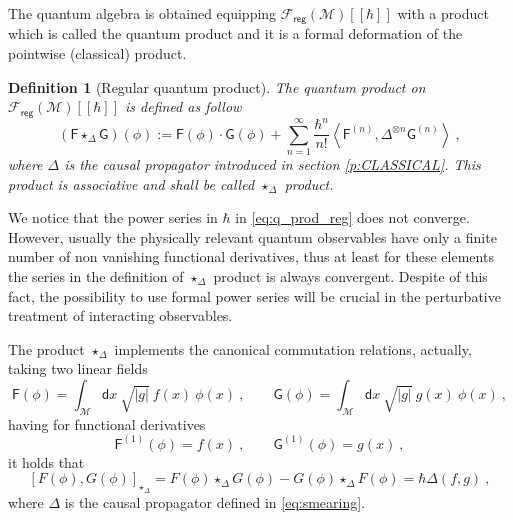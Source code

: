 \documentclass[11pt]{book}
\newcommand{\reg}{\mathsf{reg}}
\newcommand{\abs}[1]{\left|#1\right|}
\newcommand{\sm}[1]{\left\langle#1\right\rangle}
\newcommand{\Fcal}{\mathcal{F}}
\newcommand{\Mcal}{\mathcal{M}}
\newcommand{\Fsf}{\mathsf{F}}
\newcommand{\Gsf}{\mathsf{G}}
\newcommand{\dsf}{\mathsf{d}}
\theoremstyle{break}
\newtheorem{definition}{Definition}[chapter]
\begin{document}
The quantum algebra is obtained equipping $\Fcal_\reg(\Mcal)[[\hbar]]$ with a product which is called the quantum product and it is a formal deformation of the pointwise (classical) product.


\begin{definition}[Regular quantum product]
The quantum product on $\Fcal_\reg(\Mcal)[[\hbar]]$ is defined as follow
%
\begin{equation}
(\Fsf \star_\Delta \Gsf)(\phi) := \Fsf(\phi) \cdot \Gsf(\phi) + \sum_{n=1}^\infty \frac{\hbar^n}{n!} \sm{ \Fsf^{(n)} , \Delta^{\otimes n} \Gsf^{(n) } } \ ,
\label{eq:q_prod_reg}
\end{equation}
%
where $\Delta$ is the causal propagator introduced in section \ref{p:CLASSICAL}. This product is associative and shall be called $\star_\Delta$ product.
\end{definition}


We notice that the power series in $\hbar$ in \eqref{eq:q_prod_reg} does not converge. However, usually the physically relevant quantum observables have only a finite number of non vanishing functional derivatives, thus at least for these elements the series in the definition of $\star_\Delta$ product is always convergent. Despite of this fact, the possibility to use formal power series will be crucial in the perturbative treatment of interacting observables.


\bigskip


The product $\star_\Delta$ implements the canonical commutation relations, actually, taking two linear fields 
%
\begin{equation*}
\Fsf(\phi) = \int_\Mcal \dsf x \ \sqrt{\abs{g}} \ f(x) \ \phi(x) \ , \qquad \Gsf(\phi) = \int_\Mcal \dsf x \ \sqrt{\abs{g}} \ g(x) \ \phi(x) \ ,
\end{equation*}
%
having for functional derivatives
%
\begin{equation*}
\Fsf^{(1)}(\phi) = f(x) \ , \qquad \Gsf^{(1)}(\phi) = g(x) \ ,
\end{equation*}
%
it holds that 
%
\begin{equation}
\left[F(\phi),G(\phi)\right]_{\star_\Delta} =  F(\phi) \star_\Delta G(\phi) - G(\phi) \star_\Delta F(\phi) =  \hbar \Delta(f,g) \ ,
\label{eq:ccr_linear}
\end{equation}
%
where $\Delta$ is the causal propagator defined in \eqref{eq:smearing}.


\bigskip
\end{document}
